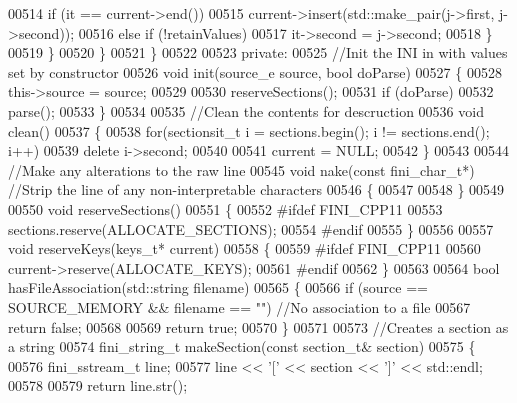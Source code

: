 \begin{DoxyCode}
00514                \textcolor{keywordflow}{if} (it == current->end())
00515                   current->insert(std::make\_pair(j->first, j->second));
00516                \textcolor{keywordflow}{else} \textcolor{keywordflow}{if} (!retainValues)
00517                   it->second = j->second;
00518             \}
00519          \}
00520       \}
00521    \}
00522 
00523 \textcolor{keyword}{private}:
00525    \textcolor{comment}{//Init the INI in with values set by constructor}
00526    \textcolor{keywordtype}{void} init(source_e source, \textcolor{keywordtype}{bool} doParse)
00527    \{
00528       this->source = source;
00529 
00530       reserveSections();
00531       \textcolor{keywordflow}{if} (doParse)
00532          parse();
00533    \}
00534 
00535    \textcolor{comment}{//Clean the contents for descruction}
00536    \textcolor{keywordtype}{void} clean()
00537    \{
00538       \textcolor{keywordflow}{for}(sectionsit\_t i = sections.begin(); i != sections.end(); i++)
00539          \textcolor{keyword}{delete} i->second;
00540 
00541       current = NULL;
00542    \}
00543 
00544    \textcolor{comment}{//Make any alterations to the raw line}
00545    \textcolor{keywordtype}{void} nake(\textcolor{keyword}{const} fini_char_t*)  \textcolor{comment}{//Strip the line of any non-interpretable characters}
00546    \{
00547 
00548    \}
00549 
00550    \textcolor{keywordtype}{void} reserveSections()
00551    \{
00552 \textcolor{preprocessor}{   #ifdef FINI\_CPP11}
00553       sections.reserve(ALLOCATE\_SECTIONS);
00554 \textcolor{preprocessor}{   #endif}
00555    \}
00556 
00557    \textcolor{keywordtype}{void} reserveKeys(keys\_t* current)
00558    \{
00559 \textcolor{preprocessor}{   #ifdef FINI\_CPP11}
00560       current->reserve(ALLOCATE\_KEYS);
00561 \textcolor{preprocessor}{   #endif}
00562    \}
00563 
00564    \textcolor{keywordtype}{bool} hasFileAssociation(std::string filename)
00565    \{
00566       \textcolor{keywordflow}{if} (source == SOURCE\_MEMORY && filename == \textcolor{stringliteral}{""}) \textcolor{comment}{//No association to a file}
00567          \textcolor{keywordflow}{return} \textcolor{keyword}{false};
00568 
00569       \textcolor{keywordflow}{return} \textcolor{keyword}{true};
00570    \}
00571 
00573    \textcolor{comment}{//Creates a section as a string}
00574    fini_string_t makeSection(\textcolor{keyword}{const} section\_t& section)
00575    \{
00576       fini_sstream_t line;
00577       line << \textcolor{charliteral}{'['} << section << \textcolor{charliteral}{']'} << std::endl;
00578 
00579       \textcolor{keywordflow}{return} line.str();

\end{DoxyCode}

